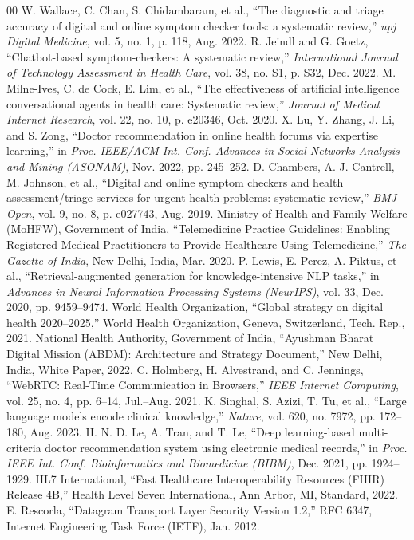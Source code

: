 \documentclass[conference]{IEEEtran}
\begin{document}
\begin{thebibliography}{00}
 W. Wallace, C. Chan, S. Chidambaram, et al., ``The diagnostic and triage accuracy of digital and online symptom checker tools: a systematic review,'' \textit{npj Digital Medicine}, vol. 5, no. 1, p. 118, Aug. 2022.
 R. Jeindl and G. Goetz, ``Chatbot-based symptom-checkers: A systematic review,'' \textit{International Journal of Technology Assessment in Health Care}, vol. 38, no. S1, p. S32, Dec. 2022.
 M. Milne-Ives, C. de Cock, E. Lim, et al., ``The effectiveness of artificial intelligence conversational agents in health care: Systematic review,'' \textit{Journal of Medical Internet Research}, vol. 22, no. 10, p. e20346, Oct. 2020.
 X. Lu, Y. Zhang, J. Li, and S. Zong, ``Doctor recommendation in online health forums via expertise learning,'' in \textit{Proc. IEEE/ACM Int. Conf. Advances in Social Networks Analysis and Mining (ASONAM)}, Nov. 2022, pp. 245--252.
 D. Chambers, A. J. Cantrell, M. Johnson, et al., ``Digital and online symptom checkers and health assessment/triage services for urgent health problems: systematic review,'' \textit{BMJ Open}, vol. 9, no. 8, p. e027743, Aug. 2019.
 Ministry of Health and Family Welfare (MoHFW), Government of India, ``Telemedicine Practice Guidelines: Enabling Registered Medical Practitioners to Provide Healthcare Using Telemedicine,'' \textit{The Gazette of India}, New Delhi, India, Mar. 2020.
 P. Lewis, E. Perez, A. Piktus, et al., ``Retrieval-augmented generation for knowledge-intensive NLP tasks,'' in \textit{Advances in Neural Information Processing Systems (NeurIPS)}, vol. 33, Dec. 2020, pp. 9459--9474.
 World Health Organization, ``Global strategy on digital health 2020--2025,'' World Health Organization, Geneva, Switzerland, Tech. Rep., 2021.
 National Health Authority, Government of India, ``Ayushman Bharat Digital Mission (ABDM): Architecture and Strategy Document,'' New Delhi, India, White Paper, 2022.
 C. Holmberg, H. Alvestrand, and C. Jennings, ``WebRTC: Real-Time Communication in Browsers,'' \textit{IEEE Internet Computing}, vol. 25, no. 4, pp. 6--14, Jul.--Aug. 2021.
 K. Singhal, S. Azizi, T. Tu, et al., ``Large language models encode clinical knowledge,'' \textit{Nature}, vol. 620, no. 7972, pp. 172--180, Aug. 2023.
 H. N. D. Le, A. Tran, and T. Le, ``Deep learning-based multi-criteria doctor recommendation system using electronic medical records,'' in \textit{Proc. IEEE Int. Conf. Bioinformatics and Biomedicine (BIBM)}, Dec. 2021, pp. 1924--1929.
 HL7 International, ``Fast Healthcare Interoperability Resources (FHIR) Release 4B,'' Health Level Seven International, Ann Arbor, MI, Standard, 2022.
 E. Rescorla, ``Datagram Transport Layer Security Version 1.2,'' RFC 6347, Internet Engineering Task Force (IETF), Jan. 2012.
\end{thebibliography}
\end{document}
